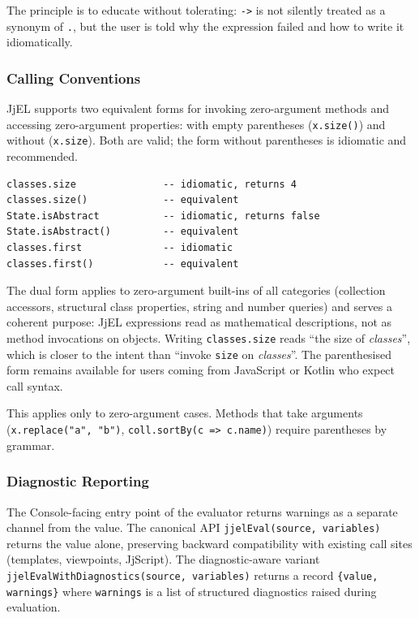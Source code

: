 \documentclass[11pt,a4paper]{article}
\newcommand{\jjel}{\textsf{JjEL}}
\begin{document}
The principle is to educate without tolerating: \texttt{->} is not silently treated as a synonym of \texttt{.}, but the user is told why the expression failed and how to write it idiomatically.

\subsubsection{Calling Conventions}\label{sec:calling-conv}

\jjel{} supports two equivalent forms for invoking zero-argument methods and accessing zero-argument properties: with empty parentheses (\texttt{x.size()}) and without (\texttt{x.size}). Both are valid; the form without parentheses is idiomatic and recommended.

\begin{lstlisting}[style=jjel,numbers=none]
classes.size               -- idiomatic, returns 4
classes.size()             -- equivalent
State.isAbstract           -- idiomatic, returns false
State.isAbstract()         -- equivalent
classes.first              -- idiomatic
classes.first()            -- equivalent
\end{lstlisting}

The dual form applies to zero-argument built-ins of all categories (collection accessors, structural class properties, string and number queries) and serves a coherent purpose: \jjel{} expressions read as mathematical descriptions, not as method invocations on objects. Writing \texttt{classes.size} reads ``the size of \emph{classes}'', which is closer to the intent than ``invoke \texttt{size} on \emph{classes}''. The parenthesised form remains available for users coming from JavaScript or Kotlin who expect call syntax.

This applies only to zero-argument cases. Methods that take arguments (\texttt{x.replace("a", "b")}, \texttt{coll.sortBy(c => c.name)}) require parentheses by grammar.

\subsubsection{Diagnostic Reporting}

The Console-facing entry point of the evaluator returns warnings as a separate channel from the value. The canonical API \texttt{jjelEval(source, variables)} returns the value alone, preserving backward compatibility with existing call sites (templates, viewpoints, JjScript). The diagnostic-aware variant \texttt{jjelEvalWithDiagnostics(source, variables)} returns a record \texttt{\{value, warnings\}} where \texttt{warnings} is a list of structured diagnostics raised during evaluation.
\end{document}
